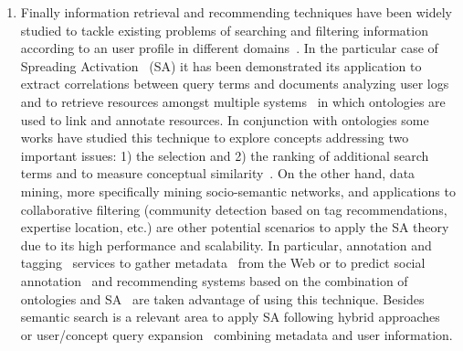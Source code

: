\begin{enumerate}
 \item Finally information retrieval and recommending techniques have been widely studied to tackle existing problems of searching 
 and filtering information according to an user profile in different domains~\cite{freews}. In the particular 
 case of Spreading Activation~\cite{Collins_Loftus_1975,Scott1981} (SA) it has been demonstrated its application to 
 extract correlations between query terms and documents analyzing user logs~\cite{Cui:2003:QEM:1435677.858986} and to retrieve resources amongst multiple 
 systems~\cite{Schumacher:2008:CFD:1789394.1789447} in which ontologies are used to link and annotate resources. In conjunction with ontologies some works 
 have studied this technique to explore concepts addressing two important issues: 1) the selection and
 2) the ranking of  additional search terms and to measure conceptual similarity~\cite{gouws-vanrooyen-engelbrecht:2010:CCSR}. 
 On the other hand, data mining, more specifically mining socio-semantic networks\cite{Troussov08miningsocio-semantic}, and applications to collaborative filtering 
 (community detection based on tag recommendations, expertise location, etc.) are other potential scenarios to apply the SA theory due to 
 its high performance and scalability. In particular, annotation and tagging~\cite{LabraGayo:2010:WAS:1668126.1668147,DBLP:journals/ijksr/RodriguezGP12} services 
 to gather metadata~\cite{GelgiVD05} from the Web or to predict social annotation~\cite{Chen:2007:PSA:1780653.1780702} and recommending
 systems based on the combination of ontologies and SA~\cite{Gao:2008:SAR:1441425.1441845} are taken advantage of using this technique. Besides 
 semantic search is a relevant area to apply SA following hybrid approaches~\cite{DBLP:conf/jckbse/BerruetaGP06,Rocha:2004:HAS:988672.988723} or user/concept
 query expansion~\cite{Nie:2003:QEQ:767396.767402} combining metadata and user information.

 \end{enumerate}
  
